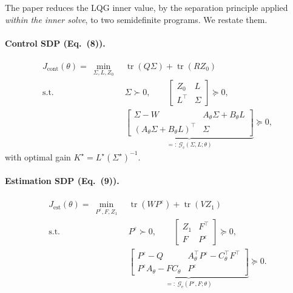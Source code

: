 \documentclass[11pt]{article}
\theoremstyle{definition}
\DeclareMathOperator{\tr}{tr}
\newcommand{\Th}{\theta}
\newcommand{\Sig}{\Sigma}
\newcommand{\Pe}{P^{\varepsilon}}
\begin{document}
The paper reduces the LQG inner value, by the separation principle applied
\emph{within the inner solve}, to two semidefinite programs. We restate them.

\paragraph{Control SDP (Eq.~(8)).}
\begin{equation}\label{eq:Jcont}
\begin{aligned}
J_{\mathrm{cont}}(\Th)=\ \min_{\Sig,L,Z_0}\ &\tr(Q\Sig)+\tr(R Z_0)\\
\text{s.t. }\ & \Sig\succ0,\qquad
\begin{bmatrix} Z_0 & L\\ L^\top & \Sig\end{bmatrix}\succeq0,\\[2pt]
& \underbrace{\begin{bmatrix}
\Sig-W & A_\Th\Sig+B_\Th L\\
(A_\Th\Sig+B_\Th L)^\top & \Sig
\end{bmatrix}}_{=:~\mathcal G_{\mathrm c}(\Sig,L;\Th)}\succeq0,
\end{aligned}
\end{equation}
with optimal gain $K^\star=L^\star(\Sig^\star)^{-1}$.

\paragraph{Estimation SDP (Eq.~(9)).}
\begin{equation}\label{eq:Jest}
\begin{aligned}
J_{\mathrm{est}}(\Th)=\ \min_{\Pe,F,Z_1}\ &\tr(W \Pe)+\tr(V Z_1)\\
\text{s.t. }\ & \Pe\succ0,\qquad
\begin{bmatrix} Z_1 & F^\top\\ F & \Pe\end{bmatrix}\succeq0,\\[2pt]
& \underbrace{\begin{bmatrix}
\Pe-Q & A_\Th^\top \Pe-C_\Th^\top F^\top\\
\Pe A_\Th-F C_\Th & \Pe
\end{bmatrix}}_{=:~\mathcal G_{\mathrm e}(\Pe,F;\Th)}\succeq0 .
\end{aligned}
\end{equation}
\end{document}
